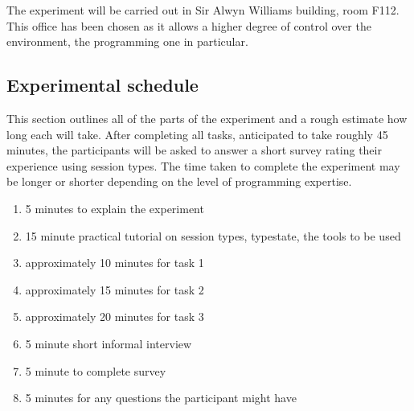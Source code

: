 \documentclass[11pt,notitlepage]{article}
\begin{document}
The experiment will be carried out in Sir Alwyn Williams building, room F112. This office has been chosen as it allows a higher degree of control over the environment, the programming one in particular.

\subsection{Experimental schedule}

This section outlines all of the parts of the experiment and a rough estimate how long each will take. After completing all tasks, anticipated to take roughly 45 minutes, the participants will be asked to answer a short survey rating their experience using session types. The time taken to complete the experiment may be longer or shorter depending on the level of programming expertise.

\begin{enumerate}
  \item 5 minutes to explain the experiment
  \item 15 minute practical tutorial on session types, typestate, the tools to be used
  \item approximately 10 minutes for task 1
  \item approximately 15 minutes for task 2
  \item approximately 20 minutes for task 3
  \item 5 minute short informal interview
  \item 5 minute to complete survey
  \item 5 minutes for any questions the participant might have
\end{enumerate}


\newpage


\end{document}
